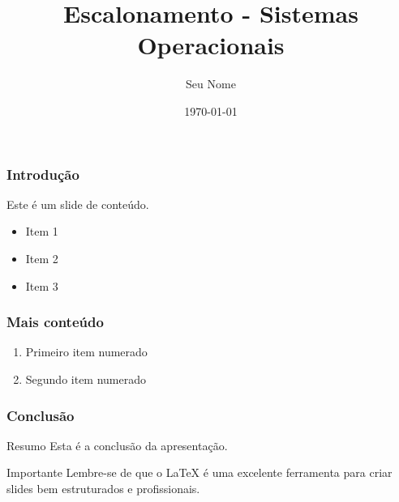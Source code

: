 \documentclass{beamer}
\title{Escalonamento - Sistemas Operacionais}
\author{Seu Nome}
\date{\today}
\begin{document}
\begin{frame}
    \titlepage
\end{frame}

\begin{frame}
    \frametitle{Introdução}
    Este é um slide de conteúdo.
    \begin{itemize}
        \item Item 1
        \item Item 2
        \item Item 3
    \end{itemize}
\end{frame}

\begin{frame}
    \frametitle{Mais conteúdo}
    \begin{enumerate}
        \item Primeiro item numerado
        \item Segundo item numerado
    \end{enumerate}
\end{frame}

\begin{frame}
    \frametitle{Conclusão}
    \begin{block}{Resumo}
        Esta é a conclusão da apresentação.
    \end{block}
    
    \begin{alertblock}{Importante}
        Lembre-se de que o LaTeX é uma excelente ferramenta para criar slides bem estruturados e profissionais.
    \end{alertblock}
\end{frame}
\end{document}
